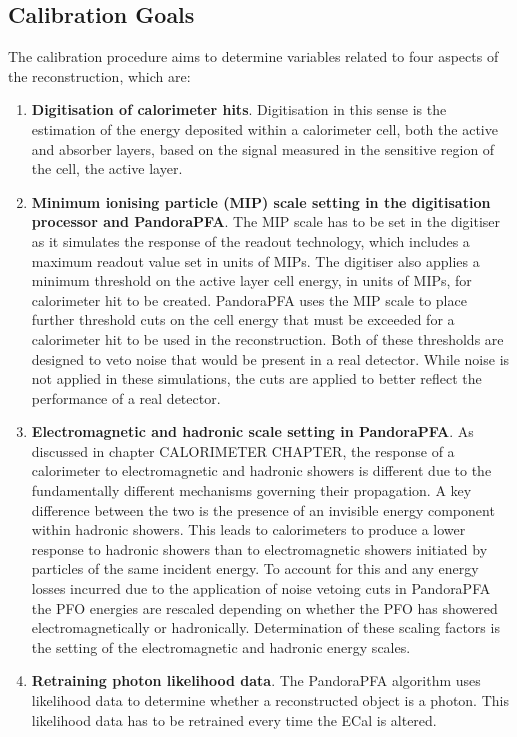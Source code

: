 
\subsection{Calibration Goals}
\label{sec:overviewcalibration}
The calibration procedure aims to determine variables related to four aspects of the reconstruction, which are:

\begin{enumerate}
\item \textbf{Digitisation of calorimeter hits}.  Digitisation in this sense is the estimation of the energy deposited within a calorimeter cell, both the active and absorber layers, based on the signal measured in the sensitive region of the cell, the active layer.  
\item \textbf{Minimum ionising particle (MIP) scale setting in the digitisation processor and PandoraPFA}.  The MIP scale has to be set in the digitiser as it simulates the response of the readout technology, which includes a maximum readout value set in units of MIPs.  The digitiser also applies a minimum threshold on the active layer cell energy, in units of MIPs, for calorimeter hit to be created.  PandoraPFA uses the MIP scale to place further threshold cuts on the cell energy that must be exceeded for a calorimeter hit to be used in the reconstruction.  Both of these thresholds are designed to veto noise that would be present in a real detector.  While noise is not applied in these simulations, the cuts are applied to better reflect the performance of a real detector. 
\item \textbf{Electromagnetic and hadronic scale setting in PandoraPFA}.  As discussed in chapter CALORIMETER CHAPTER, the response of a calorimeter to electromagnetic and hadronic showers is different due to the fundamentally different mechanisms governing their propagation.  A key difference between the two is the presence of an invisible energy component within hadronic showers.  This leads to calorimeters to produce a lower response to hadronic showers than to electromagnetic showers initiated by particles of the same incident energy.  To account for this and any energy losses incurred due to the application of noise vetoing cuts in PandoraPFA the PFO energies are rescaled depending on whether the PFO has showered electromagnetically or hadronically.  Determination of these scaling factors is the setting of the electromagnetic and hadronic energy scales.  
\item \textbf{Retraining photon likelihood data}.  The PandoraPFA algorithm uses likelihood data to determine whether a reconstructed object is a photon.  This likelihood data has to be retrained every time the ECal is altered.
\end{enumerate}

